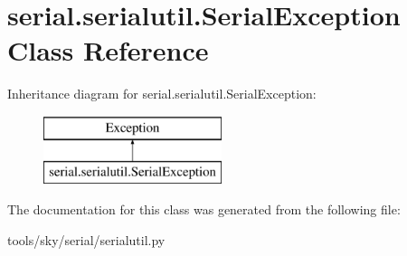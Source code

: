 \hypertarget{classserial_1_1serialutil_1_1_serial_exception}{\section{serial.\-serialutil.\-Serial\-Exception Class Reference}
\label{classserial_1_1serialutil_1_1_serial_exception}
}
Inheritance diagram for serial.\-serialutil.\-Serial\-Exception\-:\begin{figure}[H]
\begin{center}
\leavevmode
\includegraphics[height=2.000000cm]{classserial_1_1serialutil_1_1_serial_exception}
\end{center}
\end{figure}


The documentation for this class was generated from the following file\-:\begin{DoxyCompactItemize}
\item 
tools/sky/serial/serialutil.\-py\end{DoxyCompactItemize}

